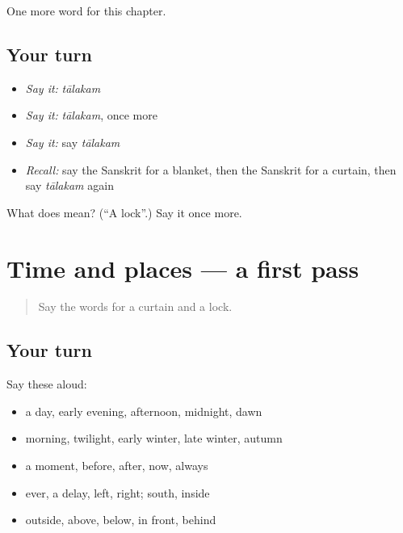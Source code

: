 \begin{grammarlens}[title={What you've built}]
One more word for this chapter.
\end{grammarlens}

\subsection*{Your turn}
\begin{itemize}
\raggedright
  \item \emph{Say it:} \emph{tālakam}
  \item \emph{Say it:} \emph{tālakam}, once more
  \item \emph{Say it:} say \emph{tālakam}
  \item \emph{Recall:} say the Sanskrit for a blanket, then the Sanskrit for a curtain, then say \emph{tālakam} again
\end{itemize}

\begin{tcolorbox}[breakable,colback=teal!4,colframe=teal!35!black,title={Before you move on}]
What does  mean? (\textquotedblleft{}A lock\textquotedblright{}.) Say it once more.
\end{tcolorbox}
\section[(dialogue)]{Time and places — a first pass}

\label{lesson:SA-R99-first-pass-time-and-places}



\begin{quote}
Say the words for a curtain and a lock.
\end{quote}

\subsection*{Your turn}
Say these aloud:

\begin{itemize}
\raggedright
  \item a day, early evening, afternoon, midnight, dawn
  \item morning, twilight, early winter, late winter, autumn
  \item a moment, before, after, now, always
  \item ever, a delay, left, right; south, inside
  \item outside, above, below, in front, behind
\end{itemize}

